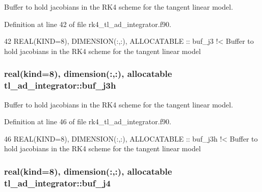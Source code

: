 Buffer to hold jacobians in the R\+K4 scheme for the tangent linear model. 



Definition at line 42 of file rk4\+\_\+tl\+\_\+ad\+\_\+integrator.\+f90.


\begin{DoxyCode}
42   \textcolor{keywordtype}{REAL(KIND=8)}, \textcolor{keywordtype}{DIMENSION(:,:)}, \textcolor{keywordtype}{ALLOCATABLE} :: buf\_j3\textcolor{comment}{ !< Buffer to hold jacobians in the RK4 scheme for the
       tangent linear model}
\end{DoxyCode}
\subsubsection[{\texorpdfstring{buf\+\_\+j3h}{buf_j3h}}]{\setlength{\rightskip}{0pt plus 5cm}real(kind=8), dimension(\+:,\+:), allocatable tl\+\_\+ad\+\_\+integrator\+::buf\+\_\+j3h\hspace{0.3cm}{\ttfamily [private]}}\hypertarget{namespacetl__ad__integrator_a9ead2c02f871be0e94e91278fa71337c}{}\label{namespacetl__ad__integrator_a9ead2c02f871be0e94e91278fa71337c}


Buffer to hold jacobians in the R\+K4 scheme for the tangent linear model. 



Definition at line 46 of file rk4\+\_\+tl\+\_\+ad\+\_\+integrator.\+f90.


\begin{DoxyCode}
46   \textcolor{keywordtype}{REAL(KIND=8)}, \textcolor{keywordtype}{DIMENSION(:,:)}, \textcolor{keywordtype}{ALLOCATABLE} :: buf\_j3h\textcolor{comment}{ !< Buffer to hold jacobians in the RK4 scheme for
       the tangent linear model}
\end{DoxyCode}
\subsubsection[{\texorpdfstring{buf\+\_\+j4}{buf_j4}}]{\setlength{\rightskip}{0pt plus 5cm}real(kind=8), dimension(\+:,\+:), allocatable tl\+\_\+ad\+\_\+integrator\+::buf\+\_\+j4\hspace{0.3cm}{\ttfamily [private]}}\hypertarget{namespacetl__ad__integrator_a853bee458e7337f1556f19370dcbc9d6}{}\label{namespacetl__ad__integrator_a853bee458e7337f1556f19370dcbc9d6}


